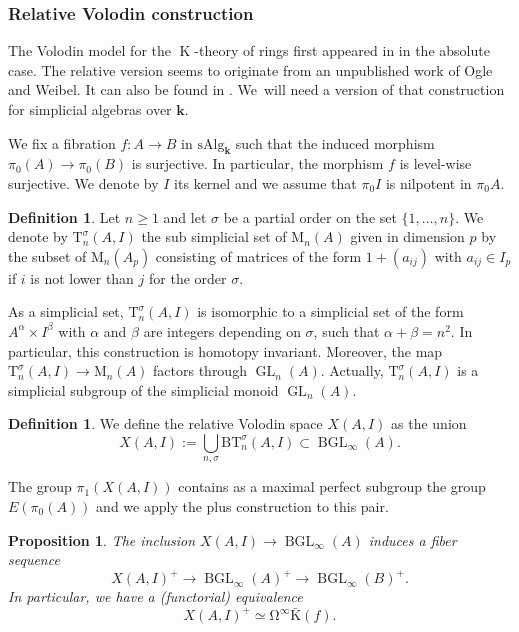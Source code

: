 \documentclass[11pt]{article}
\let\widebar\bar
\newtheorem{prop}[thm]{Proposition}
\theoremstyle{definition}
\newtheorem{df}[thm]{Definition}
\DeclareMathOperator{\BGL}{BGL}
\DeclareMathOperator{\K}{K}
\newcommand{\B}{\mathrm{B}}
\newcommand{\GL}{\operatorname{GL}}
\newcommand{\bK}{\widebar{\mathrm{K}}}
\newcommand{\infloop}{\operatorname{\Omega^\infty}}
\renewcommand{\k}{{\boldsymbol{k}}}
\newcommand{\sAlg}{\mathrm{sAlg}}
\begin{document}
\subsubsection{Relative Volodin construction}
The Volodin model for the $\K$-theory of rings first appeared in \cite{volodin:ktheory} in the absolute case. The relative version seems to originate from an unpublished work of Ogle and Weibel. It can also be found in \cite{loday:hc}. We~will need a version of that construction for simplicial algebras over $\k$.

We fix a fibration $f \colon A \to B$ in $\sAlg_\k$ such that the induced morphism $\pi_0(A) \to \pi_0(B)$ is surjective. In particular, the morphism $f$ is level-wise surjective. We denote by $I$ its kernel and we assume that $\pi_0I$ is nilpotent in $\pi_0A$.
\begin{df}
Let $n \geq 1$ and let $\sigma$ be a partial order on the set $\{1, \dots, n\}$. We denote by $\mathrm{T}^\sigma_n(A,I)$ the sub simplicial set of $\mathrm{M}_n(A)$ given in dimension $p$ by the subset of $\mathrm{M}_n(A_p)$ consisting of matrices of the form $1+(a_{ij})$ with $a_{ij} \in I_p$ if $i$ is not lower than $j$ for the order $\sigma$.
\end{df}

As a simplicial set, $\mathrm{T}^\sigma_n(A,I)$ is isomorphic to a simplicial set of the form $A^\alpha \times I^\beta$ with $\alpha$ and $\beta$ are integers depending on $\sigma$, such that $\alpha + \beta = n^2$. In particular, this construction is homotopy invariant.
Moreover, the map $\mathrm{T}^\sigma_n(A,I) \to \mathrm{M}_n(A)$ factors through $\GL_n(A)$. Actually, $\mathrm{T}^\sigma_n(A,I)$ is a simplicial subgroup of the simplicial monoid $\GL_n(A)$.

\begin{df}
We define the relative Volodin space $X(A,I)$ as the union\vspace*{-3pt}
\[
X(A,I) := \bigcup_{n, \sigma} \B\mathrm{T}^\sigma_n(A,I) \subset \BGL_\infty(A).
\]
\end{df}
\noindent The group $\pi_1(X(A,I))$ contains as a maximal perfect subgroup the group $E(\pi_0(A))$ and we apply the plus construction to this pair.

\begin{prop}
The inclusion $X(A,I) \to \BGL_\infty(A)$ induces a fiber sequence\vspace*{-3pt}
\[
X(A,I)^+ \to \BGL_\infty(A)^+ \to \BGL_\infty(B)^+.
\]
In particular, we have a (functorial) equivalence\vspace*{-3pt}
\[
X(A,I)^+ \simeq \infloop \bK(f).
\]
\end{prop}
\end{document}

